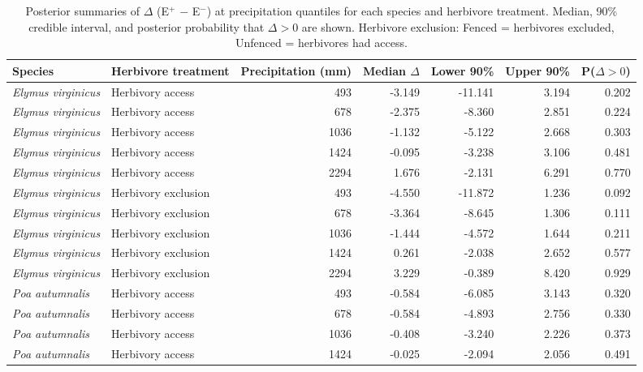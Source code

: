 \documentclass[12pt]{article}\usepackage[]{graphicx}\usepackage[dvipsnames]{xcolor}
\begin{document}
{\begin{landscape}
\begin{table}[ht]
\centering
\small
\caption[Summaries of $\Delta$ (E$^{+}$ $-$ E$^{-}$) for inflorescences across precipitation quantiles]{Posterior summaries of $\Delta$ (E$^{+}$ $-$ E$^{-}$) at precipitation quantiles for each species and herbivore  treatment. 
Median, 90\% credible interval, and posterior probability that $\Delta > 0$ are shown. 
Herbivore exclusion: Fenced = herbivores excluded, Unfenced = herbivores had access.}
\label{tab:delta_summary_spike}
\begin{tabular}{llrrrrr}
\hline
Species & Herbivore treatment & Precipitation (mm) & Median $\Delta$  & Lower 90\% & Upper 90\% & P($\Delta>0$) \\
\hline
\textit{Elymus virginicus} & Herbivory access    & 493  & -3.149 & -11.141 & 3.194  & 0.202 \\
\textit{Elymus virginicus} & Herbivory access    & 678  & -2.375 & -8.360  & 2.851  & 0.224 \\
\textit{Elymus virginicus} & Herbivory access    & 1036 & -1.132 & -5.122  & 2.668  & 0.303 \\
\textit{Elymus virginicus} & Herbivory access    & 1424 & -0.095 & -3.238  & 3.106  & 0.481 \\
\textit{Elymus virginicus} & Herbivory access    & 2294 & 1.676  & -2.131  & 6.291  & 0.770 \\
\textit{Elymus virginicus} & Herbivory exclusion & 493  & -4.550 & -11.872 & 1.236  & 0.092 \\
\textit{Elymus virginicus} & Herbivory exclusion & 678  & -3.364 & -8.645  & 1.306  & 0.111 \\
\textit{Elymus virginicus} & Herbivory exclusion & 1036 & -1.444 & -4.572  & 1.644  & 0.211 \\
\textit{Elymus virginicus} & Herbivory exclusion & 1424 & 0.261  & -2.038  & 2.652  & 0.577 \\
\textit{Elymus virginicus} & Herbivory exclusion & 2294 & 3.229  & -0.389  & 8.420  & 0.929 \\
\textit{Poa autumnalis}    & Herbivory access    & 493  & -0.584 & -6.085  & 3.143  & 0.320 \\
\textit{Poa autumnalis}    & Herbivory access    & 678  & -0.584 & -4.893  & 2.756  & 0.330 \\
\textit{Poa autumnalis}    & Herbivory access    & 1036 & -0.408 & -3.240  & 2.226  & 0.373 \\
\textit{Poa autumnalis}    & Herbivory access    & 1424 & -0.025 & -2.094  & 2.056  & 0.491 \\

\end{tabular}
\end{table}
\end{landscape}}
\end{document}
